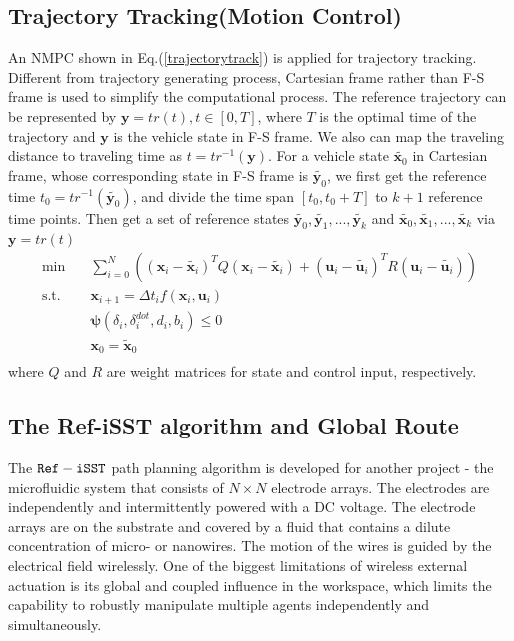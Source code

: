 \documentclass[conference, onecolumn]{IEEEtran}
\begin{document}
\subsection{Trajectory Tracking(Motion Control)}
An NMPC shown in Eq.(\ref{trajectorytrack}) is applied for trajectory tracking. Different from trajectory generating process, Cartesian frame rather than F-S frame is used to simplify the computational process. The reference trajectory can be represented by $\boldsymbol{y}=tr(t),t \in [0,T]$, where $T$ is the optimal time of the trajectory and $\boldsymbol{y}$ is the vehicle state in F-S frame. We also can map the traveling distance to traveling time as $t=tr^{-1}(\boldsymbol{y})$. For a vehicle state $\widetilde{\boldsymbol{x}_0}$ in Cartesian frame, whose corresponding state in F-S frame is $\widetilde{\boldsymbol{y}_0}$, we first get the reference time $t_0=tr^{-1}(\widetilde{\boldsymbol{y}_0})$, and divide the time span $[t_0,t_0+T]$ to $k+1$ reference time points. Then get a set of reference states $\widetilde{\boldsymbol{y}_0},\widetilde{\boldsymbol{y}_1},...,\widetilde{\boldsymbol{y}_k}$ and $\widetilde{\boldsymbol{x}_0},\widetilde{\boldsymbol{x}_1},...,\widetilde{\boldsymbol{x}_k}$ via $\boldsymbol{y}=tr(t)$
\begin{equation}
	\label{trajectorytrack}
	\begin{aligned}
		\min \quad & \sum_{i = 0}^{N}\left((\boldsymbol{x}_i-\widetilde{\boldsymbol{x}_i})^TQ(\boldsymbol{x}_i-\widetilde{\boldsymbol{x}_i}) + (\boldsymbol{u}_i-\widetilde{\boldsymbol{u}_i})^TR(\boldsymbol{u}_i-\widetilde{\boldsymbol{u}_i})\right)\\
		\textrm{s.t.} \quad & \boldsymbol{x}_{i+1}=\varDelta t_i f(\boldsymbol{x}_i,\boldsymbol{u}_i)\\
		\quad &  \boldsymbol{\psi}(\delta_i,\delta^{dot}_i,d_i,b_i)\leqslant 0 \\
		\quad & \boldsymbol{x}_0=\widetilde{\boldsymbol{x}}_0
		\\
	\end{aligned}
\end{equation}
where $Q$ and $R$ are weight matrices for state and control input, respectively.

\subsection{The Ref-iSST algorithm and Global Route}
The $\tt Ref-iSST$ path planning algorithm is developed for another project - the microfluidic system that consists of $N \times N$ electrode arrays. The electrodes are independently and intermittently powered with a DC voltage. The electrode arrays are on the substrate and covered by a fluid that contains a dilute concentration of micro- or nanowires. The motion of the wires is guided by the electrical field wirelessly. One of the biggest limitations of wireless external actuation is its global and coupled influence in the workspace, which limits the capability to robustly manipulate multiple agents independently and simultaneously.
\end{document}
